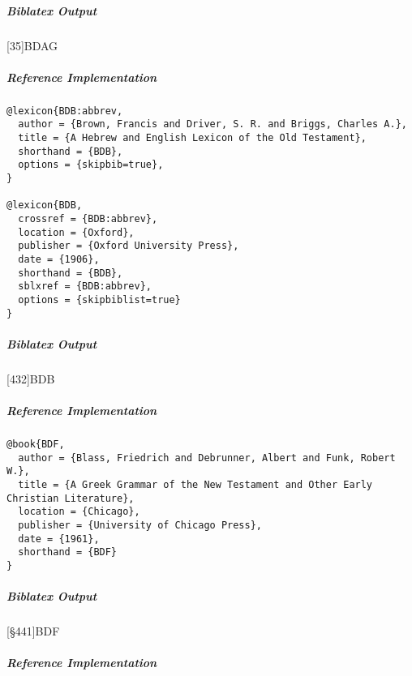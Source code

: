 \documentclass[a4paper]{article}
\newenvironment{biboutput}{%
  \subparagraph{Biblatex Output}
}{\color{black}}
\newenvironment{refimp}{%
  \subparagraph{Reference Implementation}
  \color{reference-colour}
  \rm
}{\par\color{black}}
\begin{document}
\begin{biboutput}
  [35]{BDAG}
\end{biboutput}

\begin{refimp}
\end{refimp}

\medskip

\begin{lstlisting}
@lexicon{BDB:abbrev,
  author = {Brown, Francis and Driver, S. R. and Briggs, Charles A.},
  title = {A Hebrew and English Lexicon of the Old Testament},
  shorthand = {BDB},
  options = {skipbib=true},
}

@lexicon{BDB,
  crossref = {BDB:abbrev},
  location = {Oxford},
  publisher = {Oxford University Press},
  date = {1906},
  shorthand = {BDB},
  sblxref = {BDB:abbrev},
  options = {skipbiblist=true}
}
\end{lstlisting}

\begin{biboutput}
  [432]{BDB}
\end{biboutput}

\begin{refimp}
\end{refimp}

\medskip

\begin{lstlisting}
@book{BDF,
  author = {Blass, Friedrich and Debrunner, Albert and Funk, Robert W.},
  title = {A Greek Grammar of the New Testament and Other Early Christian Literature},
  location = {Chicago},
  publisher = {University of Chicago Press},
  date = {1961},
  shorthand = {BDF}
}
\end{lstlisting}

\begin{biboutput}
  [§441]{BDF}
\end{biboutput}

\begin{refimp}
\end{refimp}
\end{document}
